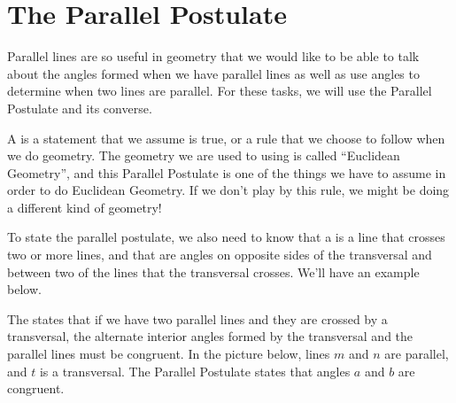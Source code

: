 \documentclass{ximera}
\begin{document}
\section{The Parallel Postulate}

Parallel lines are so useful in geometry that we would like to be able to talk about the angles formed when we have parallel lines as well as use angles to determine when two lines are parallel. For these tasks, we will use the Parallel Postulate and its converse. 

A  is a statement that we assume is true, or a rule that we choose to follow when we do geometry. The geometry we are used to using is called ``Euclidean Geometry'', and this Parallel Postulate is one of the things we have to assume in order to do Euclidean Geometry. If we don't play by this rule, we might be doing a different kind of geometry!

To state the parallel postulate, we also need to know that a  is a line that crosses two or more lines, and that  are angles on opposite sides of the transversal and between two of the lines that the transversal crosses. We'll have an example below.

\begin{definition}
The  states that if we have two parallel lines and they are crossed by a transversal, the alternate interior angles formed by the transversal and the parallel lines must be congruent. In the picture below, lines $m$ and $n$ are parallel, and $t$ is a transversal. The Parallel Postulate states that angles $a$ and $b$ are congruent.
\begin{image}
\end{image}
\end{definition}
\end{document}

